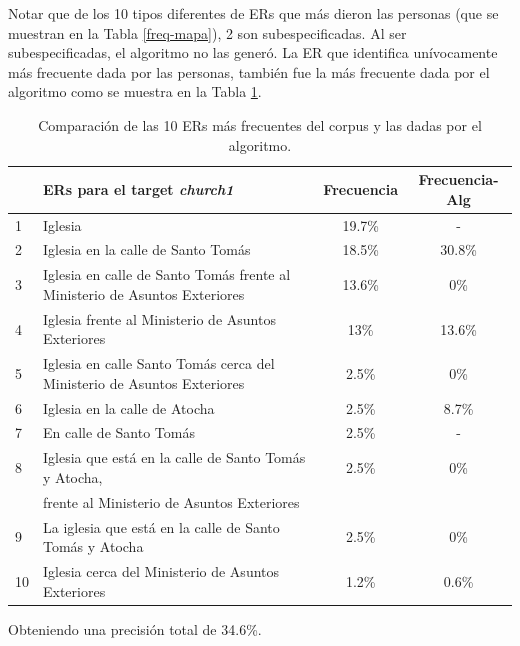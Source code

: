 Notar que de los 10 tipos diferentes de ERs que m\'as dieron las personas (que se muestran en la Tabla \ref{freq-mapa}), 
2 son subespecificadas. Al ser subespecificadas, el algoritmo no las gener\'o. 
La ER que identifica un\'ivocamente m\'as frecuente dada por las personas, tambi\'en fue la m\'as frecuente dada por el algoritmo como se muestra en la Tabla \ref{compara-corpus-alg}. 

\begin{table}[H]
{\footnotesize
\begin{center}
\begin{tabular}{|l|l|c|c|}
\hline
&ERs para el target {\it church1} 					      &  Frecuencia & Frecuencia-Alg\\ \hline \hline
1&Iglesia 								 &19.7\%  &  -\\ \hline
2&Iglesia en la calle de Santo Tom\'as						 &18.5\% 	& 30.8\%  \\ \hline
3&Iglesia en calle de Santo Tom\'as frente al Ministerio de Asuntos Exteriores        &13.6\% & 0\% \\ \hline
4&Iglesia frente al Ministerio de Asuntos Exteriores 			 &13\% & 13.6\%  \\ \hline
5&Iglesia en calle Santo Tom\'as cerca del Ministerio de Asuntos Exteriores        &2.5\% & 0\%  \\ \hline
6&Iglesia en la calle de Atocha							&2.5\%  &8.7\%  \\ \hline
7&En calle de Santo Tom\'as 							&2.5\% 	& -  \\ \hline
8&Iglesia que est\'a en la calle de Santo Tom\'as y Atocha, 	 &2.5\%	& 0\% \\ 
&frente al Ministerio de Asuntos Exteriores						 && \\ \hline
9&La iglesia que est\'a en la calle de Santo Tom\'as y Atocha			 &2.5\% 	& 0\%  \\ \hline
10&Iglesia cerca del Ministerio de Asuntos Exteriores				 &1.2\% 	&0.6\%  \\ \hline
\end{tabular}
\caption{Comparaci\'on de las 10 ERs m\'as frecuentes del corpus y las dadas por el algoritmo.}\label{compara-corpus-alg}
\end{center}
}
\end{table}

Obteniendo una precisi\'on total de 34.6\%.

